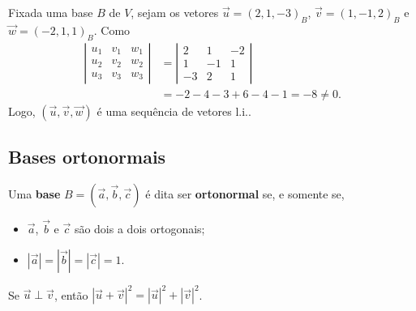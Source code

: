 \begin{ex}
  Fixada uma base $B$ de $V$, sejam os vetores $\vec{u} = (2,1,-3)_B$, $\vec{v} = (1,-1,2)_B$ e $\vec{w} = (-2,1,1)_B$. Como
  \begin{align}
    \left|\begin{array}{ccc}
            u_1 & v_1 & w_1\\
            u_2 & v_2 & w_2\\
            u_3 & v_3 & w_3
          \end{array}\right| &=
                               \left|\begin{array}{ccc}
                                       2 & 1 & -2\\
                                       1 & -1 & 1\\
                                       -3 & 2 & 1
                                     \end{array}\right| \\
    &= -2-4-3+6-4-1 = -8\neq 0.
  \end{align}
  Logo, $(\vec{u}, \vec{v}, \vec{w})$ é uma sequência de vetores l.i..
\end{ex}

\subsection{Bases ortonormais}\label{subsec:cbsbc_bortonormal}

Uma {\bf base} $B = (\vec{a}, \vec{b}, \vec{c})$ é dita ser {\bf ortonormal} se, e somente se,
\begin{itemize}
\item $\vec{a}$, $\vec{b}$ e $\vec{c}$ são dois a dois ortogonais;
\item $|\vec{a}|=|\vec{b}|=|\vec{c}|=1$.
\end{itemize}

\begin{obs}\label{obs:pitagoras}
  Se $\vec{u}\perp\vec{v}$, então $|\vec{u}+\vec{v}|^2=|\vec{u}|^2+|\vec{v}|^2$.
\end{obs}

